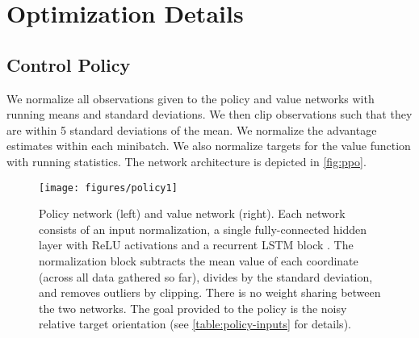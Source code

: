 \FloatBarrier
\section{Optimization Details}\label{app:hyper}
\subsection{Control Policy}\label{app:hyper-ppo}

We normalize all observations given to the policy and value networks with running means and standard deviations. We then clip observations such that they are within 5 standard deviations of the mean. We normalize the advantage estimates within each minibatch. We also normalize targets for the value function with running statistics. The network architecture is depicted in \autoref{fig:ppo}. 


\begin{figure}[t]
    \begin{minipage}[c]{0.6\textwidth}
        \texttt{[image: figures/policy1]}
    \end{minipage}\hfill
    \begin{minipage}[c]{0.4\textwidth}
        \caption{Policy network (left) and value network (right). Each network consists
        of an input normalization, a single fully-connected hidden layer with ReLU activations \citep{relu}
        and a recurrent LSTM block \citep{lstm}. The normalization block
        subtracts the mean value of each coordinate (across all data gathered so far),
        divides by the standard deviation, and removes outliers by clipping.
        There is no weight sharing between the two networks.
        The goal provided to the policy is the noisy relative target orientation (see \autoref{table:policy-inputs} for details).}
        \label{fig:ppo}
    \end{minipage}
\end{figure}    


